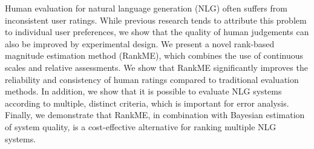 Human evaluation for natural language generation (NLG) often suffers from inconsistent user ratings. While previous research tends to attribute this problem to individual user preferences, we show that the quality of human judgements can also be improved by experimental design. We present a novel rank-based magnitude estimation method (RankME), which combines the use of continuous scales and relative assessments. We show that RankME significantly improves the reliability and consistency of human ratings compared to traditional evaluation methods. In addition, we show that it is possible to evaluate NLG systems according to multiple, distinct criteria, which is important for error analysis. Finally, we demonstrate that RankME, in combination with Bayesian estimation of system quality, is a cost-effective alternative for ranking multiple NLG systems.
